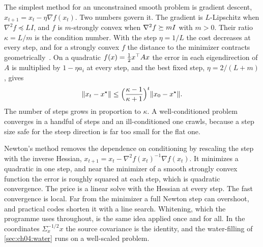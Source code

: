The simplest method for an unconstrained smooth problem is gradient descent, $x_{t+1}=x_t-\eta\nabla f(x_t)$. Two numbers govern it. The gradient is $L$-Lipschitz when $\nabla^2f\preceq LI$, and $f$ is $m$-strongly convex when $\nabla^2f\succeq mI$ with $m>0$. Their ratio $\kappa=L/m$ is the condition number. With the step $\eta=1/L$ the cost decreases at every step, and for a strongly convex $f$ the distance to the minimizer contracts geometrically~\cite{boydvandenberghe2004}. On a quadratic $f(x)=\frac12x^{\top} Ax$ the error in each eigendirection of $A$ is multiplied by $1-\eta a_i$ at every step, and the best fixed step, $\eta=2/(L+m)$, gives
\begin{equation}\label{eq:ch04:gd-rate}
\lVert x_t-x^\star\rVert\le\Bigl(\frac{\kappa-1}{\kappa+1}\Bigr)^t\lVert x_0-x^\star\rVert.
\end{equation}
The number of steps grows in proportion to $\kappa$. A well-conditioned problem converges in a handful of steps and an ill-conditioned one crawls, because a step size safe for the steep direction is far too small for the flat one.

Newton's method removes the dependence on conditioning by rescaling the step with the inverse Hessian, $x_{t+1}=x_t-\nabla^2f(x_t)^{-1}\nabla f(x_t)$. It minimizes a quadratic in one step, and near the minimizer of a smooth strongly convex function the error is roughly squared at each step, which is quadratic convergence. The price is a linear solve with the Hessian at every step. The fast convergence is local. Far from the minimizer a full Newton step can overshoot, and practical codes shorten it with a line search. Whitening, which the programme uses throughout, is the same idea applied once and for all. In the coordinates $\Sigma_x^{-1/2}x$ the source covariance is the identity, and the water-filling of \cref{sec:ch04:water} runs on a well-scaled problem.



